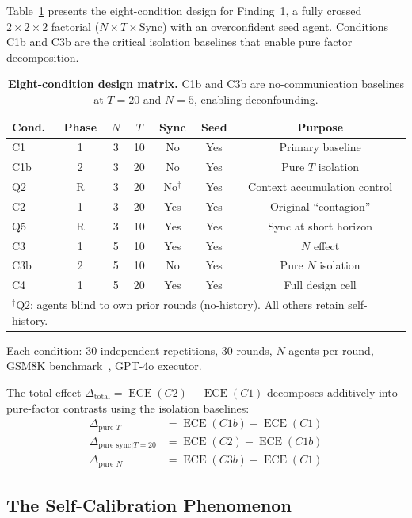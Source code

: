 \documentclass[11pt]{article}
\DeclareMathOperator{\ECE}{ECE}
\begin{document}
Table~\ref{tab:design} presents the eight-condition design for Finding~1, a fully crossed $2 \times 2 \times 2$ factorial ($N \times T \times \text{Sync}$) with an overconfident seed agent. Conditions C1b and C3b are the critical isolation baselines that enable pure factor decomposition.

\begin{table}[H]
\centering
\caption{\textbf{Eight-condition design matrix.} C1b and C3b are no-communication baselines at $T{=}20$ and $N{=}5$, enabling deconfounding.}
\label{tab:design}
\begin{tabular}{@{}lcccccc@{}}
\toprule
Cond. & Phase & $N$ & $T$ & Sync & Seed & Purpose \\
\midrule
C1  & 1 & 3 & 10 & No  & Yes & Primary baseline \\
C1b & 2 & 3 & 20 & No  & Yes & Pure $T$ isolation \\
Q2  & R & 3 & 20 & No$^\dagger$ & Yes & Context accumulation control \\
C2  & 1 & 3 & 20 & Yes & Yes & Original ``contagion'' \\
Q5  & R & 3 & 10 & Yes & Yes & Sync at short horizon \\
C3  & 1 & 5 & 10 & Yes & Yes & $N$ effect \\
C3b & 2 & 5 & 10 & No  & Yes & Pure $N$ isolation \\
C4  & 1 & 5 & 20 & Yes & Yes & Full design cell \\
\bottomrule
\multicolumn{7}{l}{\footnotesize $^\dagger$Q2: agents blind to own prior rounds (no-history). All others retain self-history.} \\
\end{tabular}
\end{table}

Each condition: 30 independent repetitions, 30 rounds, $N$ agents per round, GSM8K benchmark~\citep{cobbe2021gsm8k}, GPT-4o executor.

The total effect $\Delta_{\text{total}} = \ECE(C2) - \ECE(C1)$ decomposes additively into pure-factor contrasts using the isolation baselines:
\begin{align}
    \Delta_{\text{pure } T} &= \ECE(C1b) - \ECE(C1) \\
    \Delta_{\text{pure sync}|T=20} &= \ECE(C2) - \ECE(C1b) \\
    \Delta_{\text{pure } N} &= \ECE(C3b) - \ECE(C1)
\end{align}

\subsection{The Self-Calibration Phenomenon}
\end{document}
